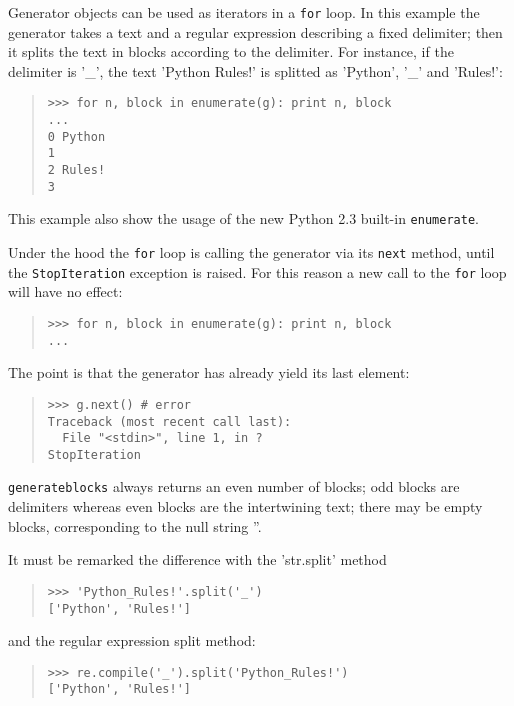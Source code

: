 \documentclass[10pt,english]{article}
\begin{document}
Generator objects can be used as iterators in a \texttt{for} loop.
In this example the generator takes a text and a regular expression
describing a fixed delimiter; then it splits the text in blocks
according to the delimiter. For instance, if the delimiter is
'{\_}', the text 'Python Rules!' is splitted as 'Python', '{\_}' and 'Rules!':
\begin{quote}
\begin{verbatim}>>> for n, block in enumerate(g): print n, block
...
0 Python
1 
2 Rules!
3\end{verbatim}
\end{quote}

This example also show the usage of the new Python 2.3 built-in \texttt{enumerate}.

Under the hood the \texttt{for} loop is calling the generator via its 
\texttt{next} method, until the \texttt{StopIteration} exception is raised.
For this reason a new call to the \texttt{for} loop will have no effect:
\begin{quote}
\begin{verbatim}>>> for n, block in enumerate(g): print n, block
...\end{verbatim}
\end{quote}

The point is that the generator has already yield its last element:
\begin{quote}
\begin{verbatim}>>> g.next() # error
Traceback (most recent call last):
  File "<stdin>", line 1, in ?
StopIteration\end{verbatim}
\end{quote}

\texttt{generateblocks} always returns an even number of blocks; odd blocks
are delimiters whereas even blocks are the intertwining text; there may be 
empty blocks, corresponding to the null string ''.

It must be remarked the difference with the 'str.split' method
\begin{quote}
\begin{verbatim}>>> 'Python_Rules!'.split('_')
['Python', 'Rules!']\end{verbatim}
\end{quote}

and the regular expression split method:
\begin{quote}
\begin{verbatim}>>> re.compile('_').split('Python_Rules!')
['Python', 'Rules!']\end{verbatim}
\end{quote}
\end{document}
